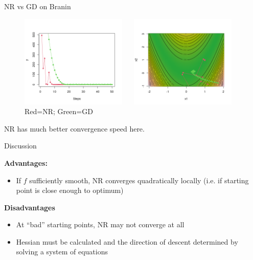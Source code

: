 \documentclass[11pt,compress,t,notes=noshow, xcolor=table]{beamer}
\begin{document}
\begin{vbframe}{NR vs GD on Branin}

\begin{figure}
    \centering
    \includegraphics[width=0.45\textwidth]{slides/05-multivariate-second-order/figure_man/NR_1.png} ~~ \includegraphics[width=0.45\textwidth]{slides/05-multivariate-second-order/figure_man/NR_2.png} \\
    Red=NR; Green=GD 
\end{figure}

NR has much better convergence speed here.

\end{vbframe}

\begin{vbframe}{Discussion}

\textbf{Advantages:}

\begin{itemize}
\item If $f$ sufficiently smooth, NR converges quadratically locally (i.e. if starting point is close enough to optimum)
\end{itemize}

\textbf{Disadvantages}

\begin{itemize}
\item At \enquote{bad} starting points, NR may not converge at all
\item Hessian must be calculated and the direction of descent determined by solving a system of equations
\end{itemize}

\end{vbframe}
\end{document}

